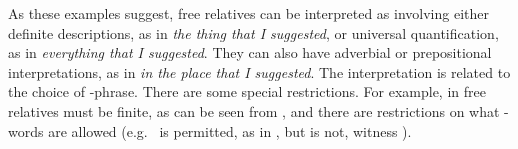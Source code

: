 \documentclass[output=paper,biblatex,babelshorthands,newtxmath,draftmode,colorlinks,citecolor=brown]{langscibook}
\begin{document}
\largerpage
\noindent
As these examples suggest, free relatives can be interpreted as involving either definite
descriptions, as in  \emph{the thing that I suggested}, or universal
quantification, as in  \emph{everything that I suggested}. They can also have
adverbial or prepositional interpretations, as in  \emph{in the place that I
suggested}. The interpretation is related to the choice of -phrase.   There are some special
restrictions.  For example, in  free relatives must be finite, as can be seen
from , and there are restrictions on what -words are allowed (e.g.\
 is permitted, as in , but  is not, witness ).
\begin{exe}\ex\begin{xlist}\label{x:rc-141}
\end{xlist}\end{exe}
\end{document}
